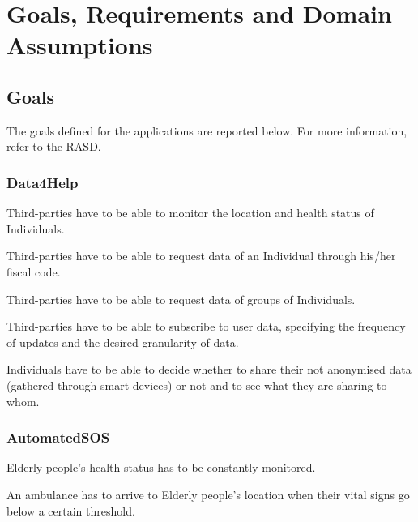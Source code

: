 \chapter{Goals, Requirements and Domain Assumptions}
\label{GoalRequirementsDomainAssumptions}


\section{Goals}
The goals defined for the applications are reported below. For more information, refer to the RASD.

\subsection{Data4Help}

    \begin{enumerate}[label={[}G1.\arabic*{]}, leftmargin=*]
        \item \label{goal1 : monitoring} Third-parties have to be able to monitor the location and health status of Individuals.
        \begin{enumerate}[label={[}G1.\arabic{enumi}.\arabic*{]}, leftmargin=*]
            \item \label{goal1 : individual monitoring}Third-parties have to be able to request data of an Individual through his/her fiscal code.
            \item \label{goal1 : group monitoring} Third-parties have to be able to request data of groups of Individuals.
            \item \label{goal1 : subscription} Third-parties have to be able to subscribe to user data, specifying the frequency of updates and the desired granularity of data.
        \end{enumerate}
        \item \label{goal1: individual privacy} Individuals have to be able to decide whether to share their not anonymised data (gathered through smart devices) or not and to see what they are sharing to whom.
    \end{enumerate}
    
    \subsection{AutomatedSOS}
    \begin{enumerate}[label={[}G2.\arabic*{]}, leftmargin=*]
        \item \label{goal2 : status monitorin} Elderly people's health status has to be constantly monitored.
        \item \label{goal2 : ambulance} An ambulance has to arrive to Elderly people's location when their vital signs go below a certain threshold.
    \end{enumerate}
    
